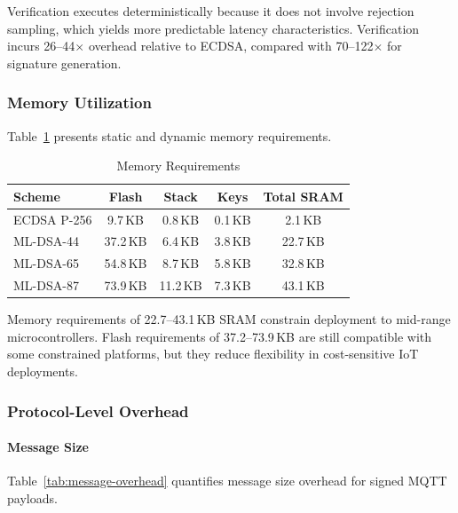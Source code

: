\documentclass[final, twoside]{IEEEtran} %
\begin{document}
Verification executes deterministically because it does not involve rejection sampling, which yields more predictable latency characteristics. Verification incurs 26--44$\times$ overhead relative to ECDSA, compared with 70--122$\times$ for signature generation.

\subsubsection{Memory Utilization}

Table~\ref{tab:memory} presents static and dynamic memory requirements.

\begin{table}[h]
	\centering
	\caption{Memory Requirements}
	\label{tab:memory}
	\begin{tabular}{lcccc}
		\toprule
		\textbf{Scheme} & \textbf{Flash} & \textbf{Stack} & \textbf{Keys} & \textbf{Total SRAM} \\
		\midrule
		ECDSA P-256     & 9.7\,KB        & 0.8\,KB        & 0.1\,KB       & 2.1\,KB             \\
		ML-DSA-44       & 37.2\,KB       & 6.4\,KB        & 3.8\,KB       & 22.7\,KB            \\
		ML-DSA-65       & 54.8\,KB       & 8.7\,KB        & 5.8\,KB       & 32.8\,KB            \\
		ML-DSA-87       & 73.9\,KB       & 11.2\,KB       & 7.3\,KB       & 43.1\,KB            \\
		\bottomrule
	\end{tabular}
\end{table}

Memory requirements of 22.7--43.1\,KB SRAM constrain deployment to mid-range microcontrollers. Flash requirements of 37.2--73.9\,KB are still compatible with some constrained platforms, but they reduce flexibility in cost-sensitive IoT deployments.

\subsubsection{Protocol-Level Overhead}

\paragraph{Message Size}

Table~\ref{tab:message-overhead} quantifies message size overhead for signed MQTT payloads.
\end{document}
